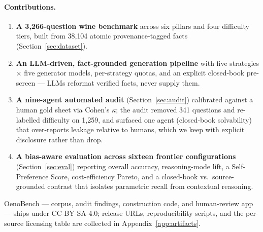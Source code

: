 \paragraph{Contributions.}
\begin{enumerate}\itemsep -1pt
  \item \textbf{A 3{,}266-question wine benchmark} across six pillars
        and four difficulty tiers, built from 38{,}104 atomic
        provenance-tagged facts (Section~\ref{sec:dataset}).
  \item \textbf{An LLM-driven, fact-grounded generation pipeline} with
        five strategies $\times$ five generator models, per-strategy
        quotas, and an explicit closed-book pre-screen --- LLMs
        reformat verified facts, never supply them.
  \item \textbf{A nine-agent automated audit} (Section~\ref{sec:audit})
        calibrated against a human gold sheet via Cohen's $\kappa$;
        the audit removed 341 questions and re-labelled difficulty on
        1{,}259, and surfaced one agent (closed-book solvability) that
        over-reports leakage relative to humans, which we keep with
        explicit disclosure rather than drop.
  \item \textbf{A bias-aware evaluation across sixteen frontier
        configurations} (Section~\ref{sec:eval}) reporting overall
        accuracy, reasoning-mode lift, a Self-Preference Score,
        cost-efficiency Pareto, and a closed-book vs.\ source-grounded
        contrast that isolates parametric recall from contextual
        reasoning.
\end{enumerate}

\noindent OenoBench --- corpus, audit findings, construction code, and
human-review app --- ships under CC-BY-SA-4.0; release URLs,
reproducibility scripts, and the per-source licensing table are
collected in Appendix~\ref{app:artifacts}.
